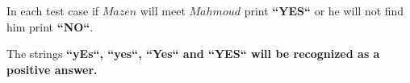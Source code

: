 In each test case if $Mazen$ will meet $Mahmoud$ print \textbf{``YES``} or he will not find him print \textbf{``NO``}.

The strings \bf{``yEs``}, \bf{``yes``}, \bf{``Yes``} and \bf{``YES``} will be recognized as a positive answer.
